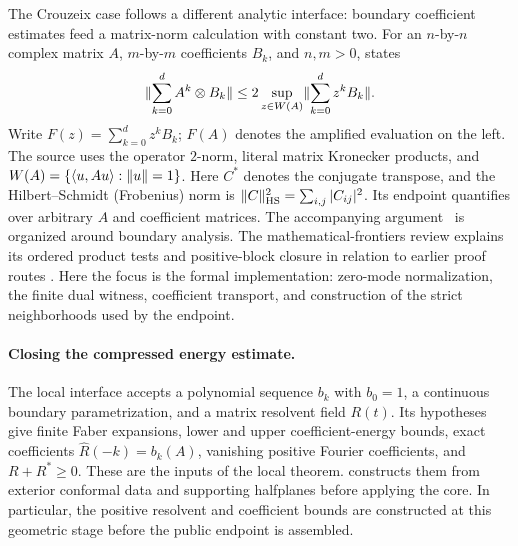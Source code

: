 The Crouzeix case follows a different analytic interface: boundary coefficient estimates feed a matrix-norm calculation with constant two.
For an $n$-by-$n$ complex matrix $A$, $m$-by-$m$ coefficients $B_k$, and
$n,m>0$,  states
\[
 \lVert\sum_{k=0}^d A^k\otimes B_k\rVert
 \leq 2\sup_{z\in W(A)}\lVert\sum_{k=0}^d z^kB_k\rVert.
\]
Write $F(z)=\sum_{k=0}^d z^kB_k$; $F(A)$ denotes the amplified
evaluation on the left. The source uses the operator $2$-norm, literal matrix Kronecker products,
and $W(A)=\{\langle u,Au\rangle:\lVert u\rVert=1\}$. Here $C^*$ denotes the
conjugate transpose, and the Hilbert--Schmidt (Frobenius) norm is
$\lVert C\rVert_{\mathrm{HS}}^2=\sum_{i,j}|C_{ij}|^2$.
Its endpoint quantifies over arbitrary $A$ and coefficient matrices.
The accompanying argument~\citep{OAICrouzeix} is organized around boundary
analysis. The mathematical-frontiers review explains its ordered product
tests and positive-block closure in relation to earlier proof routes
\citep{GounderFrontiers2026}. Here the focus is the formal implementation:
zero-mode normalization, the finite dual witness, coefficient transport,
and construction of the strict neighborhoods used by the endpoint.

\paragraph{Closing the compressed energy estimate.}
The local interface  accepts a polynomial sequence
$b_k$ with $b_0=1$, a continuous boundary parametrization, and a matrix resolvent field
$R(t)$. Its hypotheses give finite Faber expansions, lower and upper
coefficient-energy bounds, exact coefficients
$\widehat R(-k)=b_k(A)$, vanishing positive Fourier coefficients, and
$R+R^*\geq0$. These are the inputs of the local theorem.
 constructs them from exterior conformal data
and supporting halfplanes before applying the core. In particular,
the positive resolvent and coefficient bounds are constructed at this geometric stage before the public endpoint is assembled.

